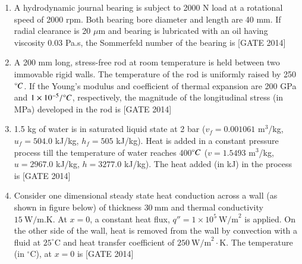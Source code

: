 \documentclass[journal,12pt,onecolumn]{IEEEtran}
\theoremstyle{remark}
\begin{document}
\begin{enumerate}
\hfill{[GATE 2014]}
    \begin{multicols}{4}
    \begin{enumerate}
        \item $\sqrt{\frac{k}{2m}}$
        \item $\sqrt{\frac{k}{m}}$
        \item $\sqrt{\frac{2k}{m}}$
        \item $\sqrt{\frac{5k}{m}}$
    \end{enumerate}
    \end{multicols}
    \item A hydrodynamic journal bearing is subject to 2000 N load at a rotational speed of 2000 rpm. Both bearing bore diameter and length are 40 mm. If radial clearance is 20 $\mu$m and bearing is lubricated with an oil having viscosity 0.03 Pa.s, the Sommerfeld number of the bearing is \underline{\hspace{2cm}}\hfill{[GATE 2014]}
   \\
    

    \item A 200 mm long, stress-free rod at room temperature is held between two immovable rigid walls. The temperature of the rod is uniformly raised by 250$\degree C$. If the Young's modulus and coefficient of thermal expansion are 200 GPa and $1 \times 10^{-5}/ \degree C$, respectively, the magnitude of the longitudinal stress (in MPa) developed in the rod is \underline{\hspace{2cm}}\hfill{[GATE 2014]}
  \\
  
\item 1.5 kg of water is in saturated liquid state at 2 bar ($v_f = 0.001061$ m$^3$/kg, $u_f = 504.0$ kJ/kg, $h_f = 505$ kJ/kg). Heat is added in a constant pressure process till the temperature of water reaches 400$\degree C$ ($v = 1.5493$ m$^3$/kg, $u = 2967.0$ kJ/kg, $h = 3277.0$ kJ/kg). The heat added (in kJ) in the process is \underline{\hspace{2cm}}\hfill{[GATE 2014]}
 \\
    
 \item Consider one dimensional steady state heat conduction across a wall (as shown in figure below) of thickness $30 \ \text{mm}$ and thermal conductivity $15 \ \text{W/m.K}$. At $x = 0$, a constant heat flux, $q'' = 1 \times 10^5 \ \text{W/m}^2$ is applied. On the other side of the wall, heat is removed from the wall by convection with a fluid at $25^\circ \text{C}$ and heat transfer coefficient of $250 \ \text{W/m}^2\cdot\text{K}$. The temperature (in $^\circ \text{C}$), at $x = 0$ is \underline{\hspace{2cm}}\hfill{[GATE 2014]}


\end{enumerate}
\end{document}

